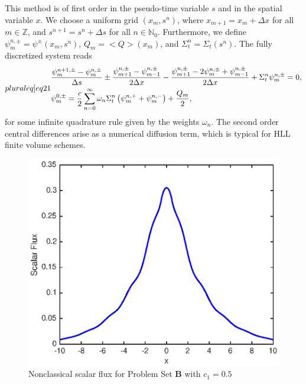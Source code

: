 \documentclass[12pt]{article}
\newcommand{\bl}{\big<}
\newcommand{\bg}{\big>}
\begin{document}
This method is of first order in the pseudo-time variable $s$ and in the spatial variable $x$.
We choose a uniform grid $(x_m,s^n)$, where $x_{m+1} = x_{m} + \Delta x$ for all $m\in\mathbb{Z}$, and $s^{n+1} = s^n + \Delta s$ for all $n\in\mathbb{N}_0$.
Furthermore, we define $\psi_{m}^{n,\pm}= \psi^\pm(x_{m},s^n)$, $Q_m = \bl Q\bg (x_m)$, and $\Sigma_t^n=\Sigma_t(s^n)$.
The fully discretized system reads
\begin{subequations}\label[pluraleq]{eq21}
\begin{align}
	& \frac{\psi^{n+1,\pm}_m-\psi^{n,\pm}_m}{\Delta s} \pm \frac{\psi^{n,\pm}_{m+1}-\psi_{m-1}^{n,\pm}}{2\Delta x} - 
			\frac{\psi^{n,\pm}_{m+1}-2\psi_m^{n,\pm}+\psi_{m-1}^{n,\pm}}{2\Delta x}   + \Sigma_t^n \psi^{n,\pm}_m = 0, \label{eq21a}\\
	&  \psi_m^{0,\pm} = \frac{c}{2}\sum\limits_{n=0}^\infty \omega_n \Sigma_t^n\left( \psi_m^{n,+} + \psi^{n,-}_m\right)  +  \frac{Q_m}{2},\label{eq21b}	
\end{align}
\end{subequations}
for some infinite quadrature rule given by the weights $\omega_n$.
The second order central differences arise as a numerical diffusion term, which is typical for HLL finite volume schemes.
\begin{figure}[htb]
  \centering
  \includegraphics[scale=1]{fig7.eps}
  \caption{Nonclassical scalar flux for Problem Set {\bf B} with $c_1=0.5$}
  \label{fig7}
\end{figure}
\end{document}
